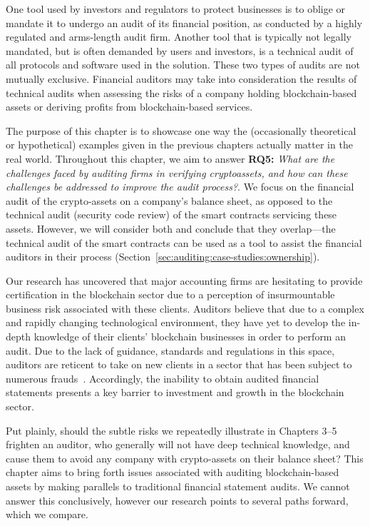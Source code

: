 One tool used by investors and regulators to protect businesses is to oblige or mandate it to undergo an audit of its financial position, as conducted by a highly regulated and arms-length audit firm. Another tool that is typically not legally mandated, but is often demanded by users and investors, is a technical audit of all protocols and software used in the solution. These two types of audits are not mutually exclusive. Financial auditors may take into consideration the results of technical audits when assessing the risks of a company holding blockchain-based assets or deriving profits from blockchain-based services. 

The purpose of this chapter is to showcase one way the (occasionally theoretical or hypothetical) examples given in the previous chapters actually matter in the real world. Throughout this chapter, we aim to answer \textbf{RQ5:} \textit{What are the challenges faced by auditing firms in verifying cryptoassets, and how can these challenges be addressed to improve the audit process?}. We focus on the financial audit of the crypto-assets on a company's balance sheet, as opposed to the technical audit (\eg security code review) of the smart contracts servicing these assets. However, we will consider both and conclude that they overlap---the technical audit of the smart contracts can be used as a tool to assist the financial auditors in their process (\eg Section~\ref{sec:auditing:case-studies:ownership}).

Our research has uncovered that major accounting firms are hesitating to provide certification in the blockchain sector due to a perception of insurmountable business risk associated with these clients. Auditors believe that due to a complex and rapidly changing technological environment, they have yet to develop the in-depth knowledge of their clients' blockchain businesses in order to perform an audit. Due to the lack of guidance, standards and regulations in this space, auditors are reticent to take on new clients in a sector that has been subject to numerous frauds~\cite{abreu2018blockchain}. Accordingly, the inability to obtain audited financial statements presents a key barrier to investment and growth in the blockchain sector. 

Put plainly, should the subtle risks we repeatedly illustrate in Chapters 3--5 frighten an auditor, who generally will not have deep technical knowledge, and cause them to avoid any company with crypto-assets on their balance sheet? This chapter aims to bring forth issues associated with auditing blockchain-based assets by making parallels to traditional financial statement audits. We cannot answer this conclusively, however our research points to several paths forward, which we compare.


